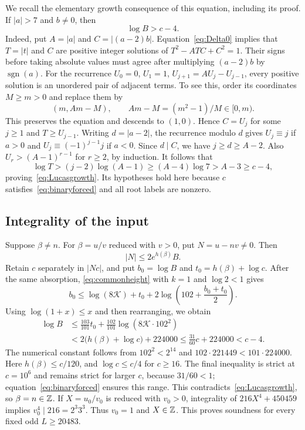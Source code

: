 \documentclass[11pt,a4paper]{article}
\begin{document}
We recall the elementary growth consequence of this equation,
including its proof. If $|a|>7$ and $b\ne0$, then
\begin{equation}\label{eq:Lucasgrowth}
                              \log B>c-4.
\end{equation}
Indeed, put $A=|a|$ and $C=|(a-2)b|$. Equation~\eqref{eq:Delta0}
implies that $T=|t|$ and $C$ are positive integer solutions of
$T^2-ATC+C^2=1$. Their signs before taking absolute values must
agree after multiplying $(a-2)b$ by $\operatorname{sgn}(a)$.
For the recurrence $U_0=0$, $U_1=1$,
$U_{j+1}=AU_j-U_{j-1}$, every positive solution is an unordered
pair of adjacent terms. To see this, order its coordinates
$M\ge m>0$ and replace them by
\[
                         \left(m,Am-M\right),\qquad
               Am-M=(m^2-1)/M\in[0,m).
\]
This preserves the equation and descends to $(1,0)$.
Hence $C=U_j$ for some $j\ge1$ and $T\ge U_{j-1}$.
Writing $d=|a-2|$, the recurrence modulo $d$ gives
$U_j\equiv j$ if $a>0$ and
$U_j\equiv(-1)^{j-1}j$ if $a<0$. Since $d\mid C$,
we have $j\ge d\ge A-2$. Also
$U_r>(A-1)^{r-1}$ for $r\ge2$, by induction.
It follows that
\[
 \log T>(j-2)\log(A-1)\ge(A-4)\log7>A-3\ge c-4,
\]
proving~\eqref{eq:Lucasgrowth}. Its hypotheses hold here because
$c$ satisfies~\eqref{eq:binaryforced} and all root labels are nonzero.

\subsection{Integrality of the input}

Suppose $\beta\ne n$. For $\beta=u/v$ reduced with $v>0$, put
$N=u-nv\ne0$. Then
\[
                         |N|\le2e^{h(\beta)}B.
\]
Retain $c$ separately in $|Nc|$, and put $b_0=\log B$ and
$t_0=h(\beta)+\log c$. After the same absorption,
\eqref{eq:commonheight} with $k=1$ and $\log2<1$ gives
\[
 b_0\le\log(8\mathcal K)+t_0+
                 2\log\left(102+\frac{b_0+t_0}{2}\right).
\]
Using $\log(1+x)\le x$ and then rearranging, we obtain
\begin{equation}\label{eq:inputlog}
 \begin{split}
 \log B&\le\frac{103}{101}t_0+
                    \frac{102}{101}\log(8\mathcal K\cdot102^2)\\
       &<2\bigl(h(\beta)+\log c\bigr)+224000
        \le\frac{31}{60}c+224000<c-4.
 \end{split}
\end{equation}
The numerical constant follows from $102^2<2^{14}$ and
$102\cdot221449<101\cdot224000$.
Here $h(\beta)\le c/120$, and $\log c\le c/4$ for $c\ge16$.
The final inequality is strict at $c=10^6$ and remains strict for
larger $c$, because $31/60<1$; equation~\eqref{eq:binaryforced}
ensures this range.
This contradicts~\eqref{eq:Lucasgrowth}, so $\beta=n\in\mathbb Z$.
If $X=u_0/v_0$ is reduced with $v_0>0$, integrality of
$216X^4+450459$ implies $v_0^4\mid216=2^3 3^3$.
Thus $v_0=1$ and $X\in\mathbb Z$. This proves soundness for every
fixed odd $L\ge20483$.
\end{document}
